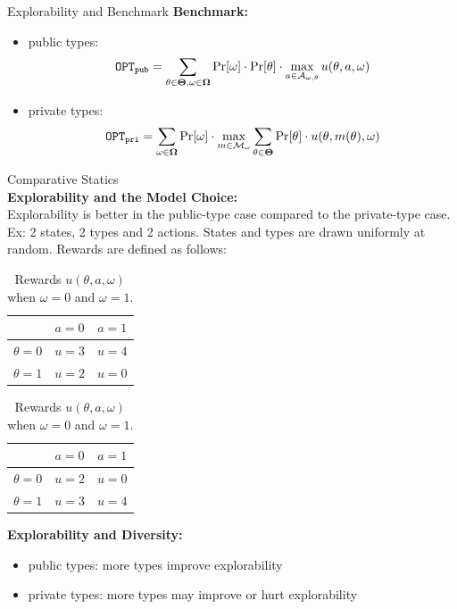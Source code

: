 \documentclass[final]{beamer}
\newlength{\onecolwid}
\newlength{\twocolwid}
\newcommand{\term}[1]{\ensuremath{\mathtt{#1}}}
\def\varTheta{\bold{\Theta}}
\def\varOmega{\bold{\Omega}}
\newcommand{\AExp}{\mA} %
\newcommand{\MExp}{\mM}  %
\def\OPT{\term{OPT}}
\newcommand{\OPTpub}{\OPT_{\term{pub}}}
\newcommand{\OPTpri}{\OPT_{\term{pri}}}
\begin{document}
\begin{frame}[t]
\begin{columns}[t]
\begin{columns}[t,totalwidth=\twocolwid]
\begin{column}{\onecolwid}
\begin{block}{Explorability and Benchmark}
\textbf{Benchmark:}
\begin{itemize}
\item public types:
\[
\OPTpub = \sum_{\theta \in \varTheta, \omega\in \varOmega} \Pr[\omega] \cdot \Pr[\theta] \cdot \max_{a \in \AExp_{\omega,\theta}} u(\theta, a, \omega)
\]
\item private types: 
\[
\OPTpri = \sum_{\omega\in \varOmega} \Pr[\omega] \cdot\max_{m \in \MExp_{\omega}}\sum_{\theta \in \varTheta} \Pr[\theta] \cdot  u(\theta, m(\theta), \omega)
\]
\end{itemize}
\end{block}

\begin{block}{Comparative Statics}
~\\
\textbf{Explorability and the Model Choice:} \\
Explorability is better in the public-type case compared to the private-type case.\\
Ex: 2 states, 2 types and 2 actions. States and types are drawn uniformly at random. Rewards are defined as follows:\\
	\begin{table}[H]
		\centering
		\begin{tabular}{|c||c|c|}
			\hline
			&$a=0$&$a=1$\\
			\hline
			\hline
			$\theta = 0$& $u = 3$ & $u =4$\\
			\hline
			$\theta = 1$& $u = 2$ & $u =0$\\
			\hline
		\end{tabular}
		\quad
		\begin{tabular}{|c||c|c|}
			\hline
			&$a=0$&$a=1$\\
			\hline
			\hline
			$\theta = 0$& $u = 2$ & $u =0$\\
			\hline
			$\theta = 1$& $u = 3$ & $u =4$\\
			\hline
		\end{tabular}
		\caption{Rewards $u(\theta,a,\omega)$ when $\omega =0 $ and $\omega = 1$.}
	\end{table}
\textbf{Explorability and Diversity:}
\begin{itemize}
\item public types: more types improve explorability
\item private types: more types may improve or hurt explorability 
\end{itemize}
\end{block}


\end{column}
\end{columns}
\end{columns}
\end{frame}
\end{document}
